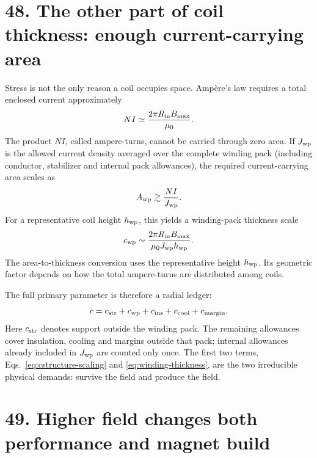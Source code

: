 \documentclass[11pt]{article}
\begin{document}

\section*{48. The other part of coil thickness: enough current-carrying area}

Stress is not the only reason a coil occupies space. Amp\`ere's law requires a total
enclosed current approximately
\begin{equation}
 NI\simeq\frac{2\pi R_{\rm in}B_{\max}}{\mu_0}.
 \label{eq:tf-ampere-turns}
\end{equation}
The product $NI$, called ampere-turns, cannot be carried through zero area. If
$J_{\rm wp}$ is the allowed current density averaged over the complete winding pack
(including conductor, stabilizer and internal pack allowances), the
required current-carrying area scales as
\begin{equation}
 A_{\rm wp}\gtrsim\frac{NI}{J_{\rm wp}}.
 \label{eq:winding-area}
\end{equation}
For a representative coil height $h_{\rm wp}$, this yields a winding-pack thickness
scale
\begin{equation}
 c_{\rm wp}\sim\frac{2\pi R_{\rm in}B_{\max}}
 {\mu_0J_{\rm wp}h_{\rm wp}}.
 \label{eq:winding-thickness}
\end{equation}
The area-to-thickness conversion uses the representative height $h_{\rm wp}$.
Its geometric factor depends on how the total ampere-turns are distributed among coils.

The full primary parameter is therefore a radial ledger:
\begin{equation}
 c=c_{\rm str}+c_{\rm wp}+c_{\rm ins}+c_{\rm cool}+c_{\rm margin}.
 \label{eq:coil-build}
\end{equation}
Here $c_{\rm str}$ denotes support outside the winding pack. The remaining
allowances cover insulation, cooling and margins outside that pack; internal
allowances already included in $J_{\rm wp}$ are counted only once. The first two
terms, Eqs.~\eqref{eq:cstructure-scaling} and \eqref{eq:winding-thickness}, are the
two irreducible physical demands: survive the field and produce the field.

\section*{49. Higher field changes both performance and magnet build}
\end{document}
